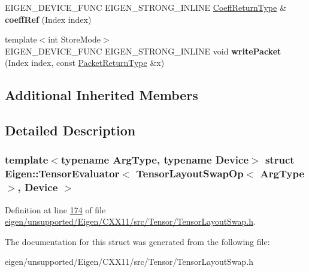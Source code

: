 \begin{DoxyCompactItemize}
\item 
\mbox{\label{struct_eigen_1_1_tensor_evaluator_3_01_tensor_layout_swap_op_3_01_arg_type_01_4_00_01_device_01_4_af6b35eff16e9d3337396d9a4935d9b39}} 
E\+I\+G\+E\+N\+\_\+\+D\+E\+V\+I\+C\+E\+\_\+\+F\+U\+NC E\+I\+G\+E\+N\+\_\+\+S\+T\+R\+O\+N\+G\+\_\+\+I\+N\+L\+I\+NE \hyperlink{group___sparse_core___module}{Coeff\+Return\+Type} \& {\bfseries coeff\+Ref} (Index index)
\item 
\mbox{\label{struct_eigen_1_1_tensor_evaluator_3_01_tensor_layout_swap_op_3_01_arg_type_01_4_00_01_device_01_4_a6470ad4d4223afec700ca7fcc7f62888}} 
{\footnotesize template$<$int Store\+Mode$>$ }\\E\+I\+G\+E\+N\+\_\+\+D\+E\+V\+I\+C\+E\+\_\+\+F\+U\+NC E\+I\+G\+E\+N\+\_\+\+S\+T\+R\+O\+N\+G\+\_\+\+I\+N\+L\+I\+NE void {\bfseries write\+Packet} (Index index, const \hyperlink{group___sparse_core___module}{Packet\+Return\+Type} \&x)
\end{DoxyCompactItemize}
\subsection*{Additional Inherited Members}


\subsection{Detailed Description}
\subsubsection*{template$<$typename Arg\+Type, typename Device$>$\newline
struct Eigen\+::\+Tensor\+Evaluator$<$ Tensor\+Layout\+Swap\+Op$<$ Arg\+Type $>$, Device $>$}



Definition at line \hyperlink{eigen_2unsupported_2_eigen_2_c_x_x11_2src_2_tensor_2_tensor_layout_swap_8h_source_l00174}{174} of file \hyperlink{eigen_2unsupported_2_eigen_2_c_x_x11_2src_2_tensor_2_tensor_layout_swap_8h_source}{eigen/unsupported/\+Eigen/\+C\+X\+X11/src/\+Tensor/\+Tensor\+Layout\+Swap.\+h}.



The documentation for this struct was generated from the following file\+:\begin{DoxyCompactItemize}
\item 
eigen/unsupported/\+Eigen/\+C\+X\+X11/src/\+Tensor/\+Tensor\+Layout\+Swap.\+h\end{DoxyCompactItemize}
